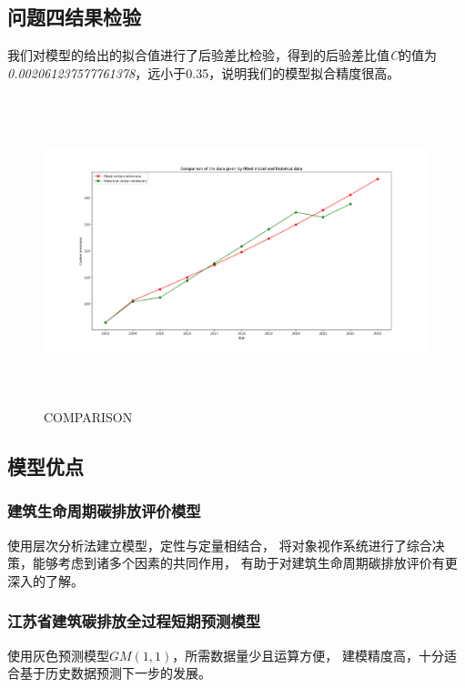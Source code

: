 \documentclass[a4paper, 12pt]{article}
\numberwithin{equation}{section}
\begin{document}
        \subsection{问题四结果检验}
            我们对模型的给出的拟合值进行了后验差比检验，得到的后验差比值\textit{C}的值为\textit{0.002061237577761378}，远小于0.35，说明我们的模型拟合精度很高。
            \begin{figure}[h]
                \centering
                \includegraphics[height=9cm,width=15cm]{fit_and_his_q4.png}
                \caption{COMPARISON}
            \end{figure}


    {}
        \subsection{模型优点}
            \subsubsection{建筑生命周期碳排放评价模型}
                使用层次分析法建立模型，定性与定量相结合，
                将对象视作系统进行了综合决策，能够考虑到诸多个因素的共同作用，
                有助于对建筑生命周期碳排放评价有更深入的了解。

            \subsubsection{江苏省建筑碳排放全过程短期预测模型}
                使用灰色预测模型$ GM (1, 1) $，所需数据量少且运算方便，
                建模精度高，十分适合基于历史数据预测下一步的发展。
\end{document}
